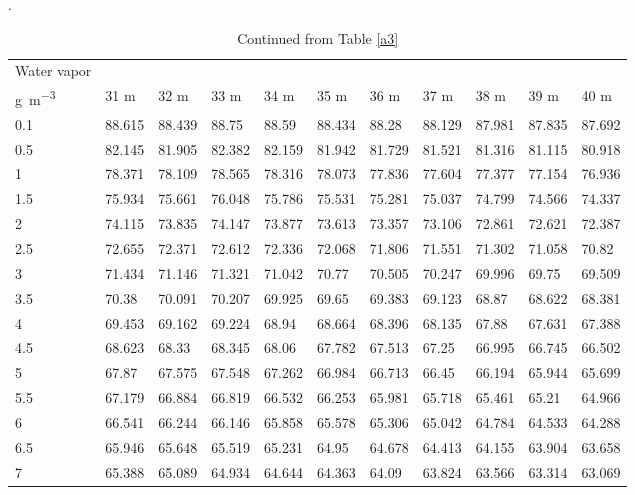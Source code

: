 \begin{bibunit}
\begin{table}[]
	\centering
	\scriptsize
	\caption{Continued from Table \ref{a3}}.
	\label{a4}
	\begin{tabular}{lllllllllll}
		\toprule
				Water vapor &&&&&&&&&&\\
				    		\si{\gram\per\meter\cubed}& 31 \si{\meter}     & 32 \si{\meter}     & 33 \si{\meter}     & 34 \si{\meter}     & 35 \si{\meter}     & 36 \si{\meter}     & 37 \si{\meter}     & 38 \si{\meter}     & 39 \si{\meter}     & 40 \si{\meter}     \\
				     		\midrule
				0.1  & 88.615 & 88.439 & 88.75  & 88.59  & 88.434 & 88.28  & 88.129 & 87.981 & 87.835 & 87.692 \\
				0.5  & 82.145 & 81.905 & 82.382 & 82.159 & 81.942 & 81.729 & 81.521 & 81.316 & 81.115 & 80.918 \\
				1    & 78.371 & 78.109 & 78.565 & 78.316 & 78.073 & 77.836 & 77.604 & 77.377 & 77.154 & 76.936 \\
				1.5  & 75.934 & 75.661 & 76.048 & 75.786 & 75.531 & 75.281 & 75.037 & 74.799 & 74.566 & 74.337 \\
				2    & 74.115 & 73.835 & 74.147 & 73.877 & 73.613 & 73.357 & 73.106 & 72.861 & 72.621 & 72.387 \\
				2.5  & 72.655 & 72.371 & 72.612 & 72.336 & 72.068 & 71.806 & 71.551 & 71.302 & 71.058 & 70.82  \\
				3    & 71.434 & 71.146 & 71.321 & 71.042 & 70.77  & 70.505 & 70.247 & 69.996 & 69.75  & 69.509 \\
				3.5  & 70.38  & 70.091 & 70.207 & 69.925 & 69.65  & 69.383 & 69.123 & 68.87  & 68.622 & 68.381 \\
				4    & 69.453 & 69.162 & 69.224 & 68.94  & 68.664 & 68.396 & 68.135 & 67.88  & 67.631 & 67.388 \\
				4.5  & 68.623 & 68.33  & 68.345 & 68.06  & 67.782 & 67.513 & 67.25  & 66.995 & 66.745 & 66.502 \\
				5    & 67.87  & 67.575 & 67.548 & 67.262 & 66.984 & 66.713 & 66.45  & 66.194 & 65.944 & 65.699 \\
				5.5  & 67.179 & 66.884 & 66.819 & 66.532 & 66.253 & 65.981 & 65.718 & 65.461 & 65.21  & 64.966 \\
				6    & 66.541 & 66.244 & 66.146 & 65.858 & 65.578 & 65.306 & 65.042 & 64.784 & 64.533 & 64.288 \\
				6.5  & 65.946 & 65.648 & 65.519 & 65.231 & 64.95  & 64.678 & 64.413 & 64.155 & 63.904 & 63.658 \\
				7    & 65.388 & 65.089 & 64.934 & 64.644 & 64.363 & 64.09  & 63.824 & 63.566 & 63.314 & 63.069 \\

\end{tabular}
\end{table}
\end{bibunit}
